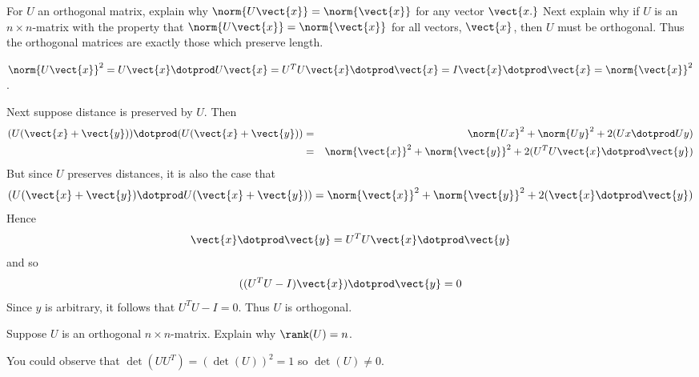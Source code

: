 \begin{ex} For $U$ an orthogonal matrix, explain why $\norm{U\vect{x}
} =\norm{\vect{x}} $ for any vector $
\vect{x.}$ Next explain why if $U$ is an $n\times n$-matrix with the
property that $\norm{U\vect{x}} =\norm{
\vect{x}} $ for all vectors, $\vect{x}$, then $U$ must be
orthogonal. Thus the orthogonal matrices are exactly those which preserve
length.
\begin{sol}
$\norm{U\vect{x}} ^{2}=  U\vect{x} \dotprod U
\vect{x}  = U^{T}U\vect{x} \dotprod \vect{x} = I\vect{x} \dotprod \vect{x}
 =\norm{\vect{x}} ^{2}$.

 Next suppose distance is
preserved by $U$. Then
\begin{eqnarray*}
(U(\vect{x}+\vect{y}))  \dotprod (U(\vect{x}+\vect{y}
)) &=&\norm{Ux} ^{2}+\norm{Uy}
^{2}+2 (Ux \dotprod Uy) \\
&=&\norm{\vect{x}} ^{2}+\norm{\vect{y}}
^{2}+2(U^{T}U\vect{x} \dotprod \vect{y})
\end{eqnarray*}
But since $U$ preserves distances, it is also the case that
\[
(U(\vect{x}+\vect{y}) \dotprod U(\vect{x}+\vect{y}
)) =\norm{\vect{x}} ^{2}+\norm{\vect{y}
} ^{2}+2(\vect{x}\dotprod \vect{y})
\]
Hence
\[
 \vect{x} \dotprod \vect{y} = U^{T}U\vect{x} \dotprod \vect{y}
\]
and so
\[
((U^{T}U-I) \vect{x}) \dotprod \vect{y} =0
\]
Since $y$ is arbitrary, it follows that $U^{T}U-I=0$. Thus $U$ is orthogonal.
\end{sol}
\end{ex}

\begin{ex} Suppose $U$ is an orthogonal $n\times n$-matrix. Explain why $\rank(U) =n$.
\begin{sol}
You could observe that $\det (UU^{T})
=(\det (U)) ^{2}=1$ so $\det (U) \neq 0.
$
\end{sol}
\end{ex}

